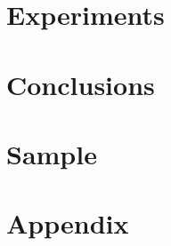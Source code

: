 \documentclass[11pt]{article}
\begin{document}
\section{Experiments}\label{section-experiments}

\section{Conclusions}\label{section-conclusions}

\section{Sample}\label{section-sample}

\section{Appendix}\label{section-appendix}





\end{document}
